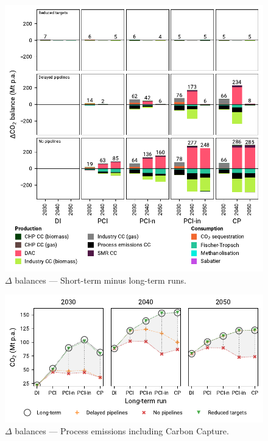 \documentclass[final,5p,times,twocolumn,sort&compress]{elsarticle}
\begin{document}
\begin{figure}[htbp]
  \centering
  \includegraphics[width=\linewidth]{balances_overview_extended_co2 stored}
  \caption{$\Delta$ balances --- Short-term minus long-term runs.}
  \label{fig:balances_overview_extended_co2_stored}
\end{figure}

\begin{figure}[htbp]
  \centering
  \includegraphics[width=\linewidth]{delta_balances_process emissions CC}
  \caption{$\Delta$ balances --- Process emissions including Carbon Capture.}
  \label{fig:delta_balances_process_emissions_CC}
\end{figure}
\end{document}

